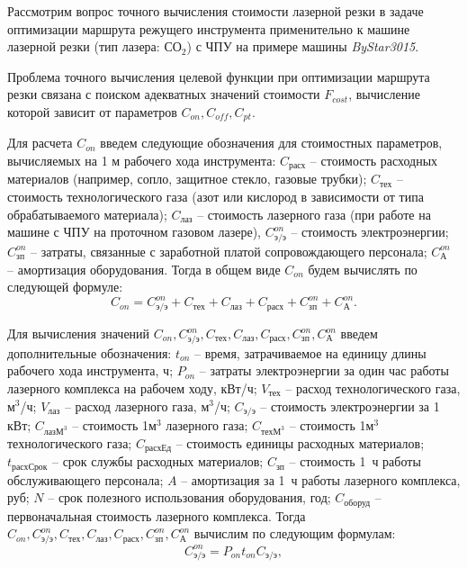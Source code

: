 \documentclass[11pt,twoside,openany]{report}
\begin{document}
Рассмотрим вопрос точного вычисления
стоимости лазерной резки в задаче
оптимизации маршрута режущего инструмента
применительно к машине лазерной резки (тип лазера: СО$_2$)
с ЧПУ на примере машины
{\it ByStar3015}.

Проблема точного вычисления целевой функции
при оптимизации маршрута резки связана с
поиском адекватных значений стоимости
$F_{cost}$,
вычисление которой зависит от параметров
$C_{on}, C_{off}, C_{pt}$.

Для расчета
$C_{on}$
введем следующие обозначения для стоимостных параметров,
вычисляемых на 1 м рабочего хода инструмента:
$C_\text{расх}$ -- стоимость расходных материалов (например, сопло, защитное стекло, газовые трубки);
$C_\text{тех}$ -- стоимость технологического газа (азот или кислород в зависимости от типа обрабатываемого материала);
$C_\text{лаз}$ -- стоимость лазерного газа (при работе на машине с ЧПУ на проточном газовом лазере),
$C_\text{э/э}^{on}$ -- стоимость электроэнергии;
$C_\text{зп}^{on}$ -- затраты, связанные с заработной платой сопровождающего персонала;
$C_\text{А}^{on}$ -- амортизация оборудования.
Тогда в общем виде
$C_{on}$
будем вычислять по следующей формуле:
\begin{equation}
  C_{on} =
  C_\text{э/э}^{on} +
  C_\text{тех} +
  C_\text{лаз} +
  C_\text{расх} +
  C_\text{зп}^{on} +
  C_\text{А}^{on}
  .
  \label{c-on}
\end{equation}

Для вычисления значений
$C_{on}, C_\text{э/э}^{on}, C_\text{тех},
C_\text{лаз}, C_\text{расх}, C_\text{зп}^{on}, C_\text{А}^{on}$
введем дополнительные обозначения:
$t_{on}$ -- время, затрачиваемое на единицу длины рабочего хода инструмента, ч;
$P_{on}$ -- затраты электроэнергии за один час работы лазерного комплекса на рабочем ходу, кВт/ч;
$V_\text{тех}$ -- расход технологического газа, м$^3$/ч;
$V_\text{лаз}$ -- расход лазерного газа, м$^3$/ч;
$C_\text{э/э}$ -- стоимость электроэнергии за 1 кВт;
$C_{\text{лазМ}^3}$ -- стоимость 1м$^3$ лазерного газа;
$C_{\text{техМ}^3}$ -- стоимость 1м$^3$ технологического газа;
$C_\text{расхЕд}$ -- стоимость единицы расходных материалов;
$t_\text{расхСрок}$ -- срок службы расходных материалов;
$C_\text{зп}$ -- стоимость 1~ч работы обслуживающего персонала;
$A$ -- амортизация за 1~ч работы лазерного комплекса, руб;
$N$ -- срок полезного использования оборудования, год;
$C_\text{оборуд}$ -- первоначальная стоимость лазерного комплекса.
Тогда
$C_{on}, C_\text{э/э}^{on}, C_\text{тех},
C_\text{лаз}, C_\text{расх}, C_\text{зп}^{on}, C_\text{А}^{on}$
вычислим по следующим формулам:
\begin{equation}
  C_\text{э/э}^{on} =
  P_{on} t_{on}   C_\text{э/э}
  ,
  \label{c-on-ee}
\end{equation}
\end{document}
